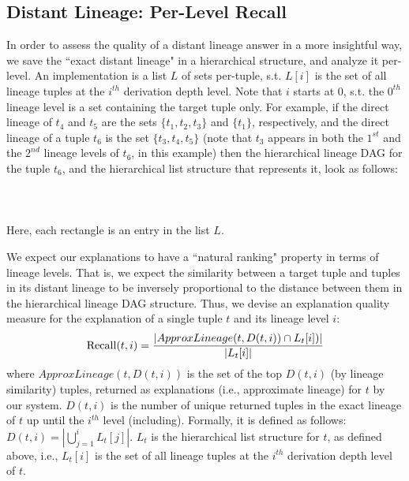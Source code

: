 \subsection{Distant Lineage: Per-Level Recall}\label{sec:recall}
    In order to assess the quality of a distant lineage answer in a more insightful way, we save the ``exact distant lineage" in a hierarchical structure, and analyze it per-level. An implementation is a list $L$ of sets per-tuple, s.t. $L[i]$ is the set of all lineage tuples at the $i^{th}$ derivation depth level. Note that $i$ starts at $0$, s.t. the $0^{th}$ lineage level is a set containing the target tuple only. For example, if the direct lineage of $t_4$ and $t_5$ are the sets $\{t_1, t_2, t_3\}$ and $\{t_1\}$, respectively, and the direct lineage of a tuple $t_6$ is the set $\{t_3, t_4, t_5\}$ (note that $t_3$ appears in both the $1^{st}$ and the $2^{nd}$ lineage levels of $t_6$, in this example) then the hierarchical lineage DAG for the tuple $t_6$, and the hierarchical list structure that represents it, look as follows: \\\\
     \hspace{35pt}
     \\\\
Here, each rectangle is an entry in the list $L$.
\par We expect our explanations to have a ``natural ranking" property in terms of lineage levels. That is, we expect the similarity between a target tuple and tuples in its distant lineage to be inversely proportional to the distance between them in the hierarchical lineage DAG structure. Thus, we devise an explanation quality measure for the explanation of a single tuple $t$ and its lineage level $i$:
\begin{equation*}
    \operatorname{Recall}(t, i) = \frac{|ApproxLineage(t, D(t, i)) \cap L_t[i])|}{|L_t[i]|}\\
\end{equation*}
where $ApproxLineage(t, D(t, i))$ is the set of the top $D(t, i)$ (by lineage similarity) tuples, returned as explanations (i.e., approximate lineage) for $t$ by our system.
$D(t, i)$ is the number of unique returned tuples in the exact lineage of $t$ up until the $i^{th}$ level (including). Formally, it is defined as follows: $D(t, i) = |\bigcup\limits_{j=1}^{i} L_t[j]|$.
$L_t$ is the hierarchical list structure for $t$, as defined above, i.e., $L_t[i]$ is the set of all lineage tuples at the $i^{th}$ derivation depth level of $t$.\\

